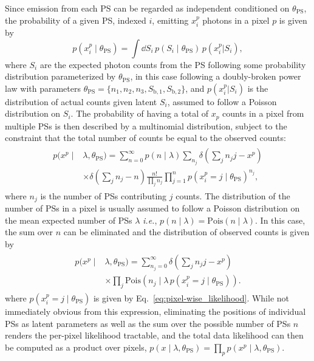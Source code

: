 \documentclass[prd,aps,10pt,nofootinbib,twocolumn,superscriptaddress,preprintnumbers,balancelastpage,longbibliography,floatfix]{revtex4-2}
\begin{document}
Since emission from each PS can be regarded as independent conditioned on $\theta_\mathrm{PS}$, the probability of a given PS, indexed $i$, emitting $x^p_i$ photons in a pixel $p$ is given by
\begin{equation}
\label{eq:pixel-wise_likelihood}
p(x^p_i\mid\theta_\mathrm{PS}) = \int \dd S_i \,p(S_i\mid\theta_\mathrm{PS})\,p(x^p_i|S_i),
\end{equation}
where $S_i$ are the expected photon counts from the PS following some probability distribution parameterized by $\theta_\mathrm{PS}$, in this case following a doubly-broken power law with parameters $\theta_\mathrm{PS} = \{n_1, n_2, n_3, S_\mathrm{b,1}, S_\mathrm{b,2}\}$, and $p(x^p_i|S_i)$ is the distribution of actual counts given latent $S_i$, assumed to follow a Poisson distribution on $S_i$. The probability of having a total of $x_p$ counts in a pixel from multiple PSs is then described by a multinomial distribution, subject to the constraint that the total number of counts be equal to the observed counts:
\small
\begin{align}
\label{eq:pixel-wise_likelihood_multinomial}
\begin{split}
p(x^p\mid&\lambda,\theta_\mathrm{PS}) =  \sum_{n = 0}^{\infty}  p\left(n \mid \lambda\right) \sum_{n_{j}} \delta\left(\sum_j n_{j}j - x^p\right) \\ 
&\times \delta\left(\sum_j n_{j} - n\right) \frac{n!}{\prod_j n_{j} }\prod_{j=1}^{n} p(x^p_i = j\mid\theta_\mathrm{PS})  ^ {n_{j}},
\end{split}
\end{align}
\normalsize
where $n_j$ is the number of PSs contributing $j$ counts. The distribution of the number of PSs in a pixel is usually assumed to follow a Poisson distribution on the mean expected number of PSs $\lambda$ \emph{i.e.}, $p(n\mid\lambda) = \mathrm{Pois}(n\mid\lambda)$. In this case, the sum over $n$ can be eliminated and the distribution of observed counts is given by
\begin{align}
\label{eq:pixel-wise_likelihood_poisson}
\begin{split}
p(x^p\mid&\lambda, \theta_\mathrm{PS}) = \sum_{n_j = 0}^{\infty} \delta\left(\sum_j n_{j}j - x^p\right) \\ & \times \prod_j \mathrm{Pois}\left(n_{j}\mid\lambda \, p(x^p_i = j\mid\theta_\mathrm{PS})\right).
\end{split}
\end{align}
where $p(x^p_i = j\mid\theta_\mathrm{PS})$ is given by Eq.~\eqref{eq:pixel-wise_likelihood}. 
While not immediately obvious from this expression, eliminating the positions of individual PSs as latent parameters as well as the sum over the possible number of PSs $n$ renders the per-pixel likelihood tractable, and the total data likelihood can then be computed as a product over pixels, $p(x\mid\lambda,\theta_\mathrm{PS}) = \prod_{p} p(x^p\mid\lambda,\theta_\mathrm{PS})$.
\end{document}
